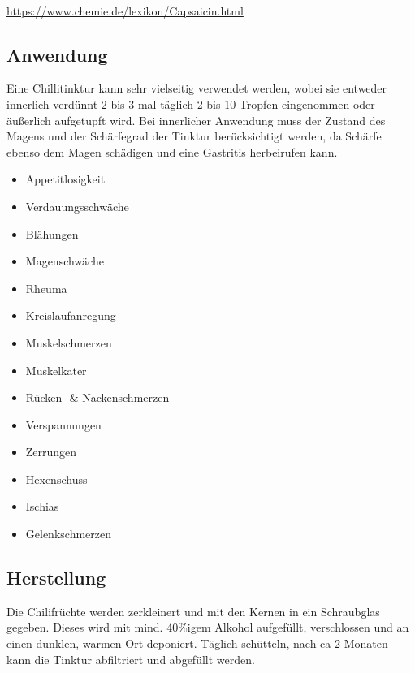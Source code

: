 \cite{tinkturen}  ~\cite{heilkraeuterlexikon}

\url{https://www.chemie.de/lexikon/Capsaicin.html}

                

\subsection{Anwendung}

Eine Chillitinktur kann sehr vielseitig verwendet werden, wobei sie entweder innerlich verdünnt 2 bis 3  mal täglich 2 bis 10 Tropfen eingenommen oder äußerlich aufgetupft wird. Bei innerlicher Anwendung muss der Zustand des Magens und der Schärfegrad der Tinktur berücksichtigt werden, da Schärfe ebenso dem Magen schädigen und eine Gastritis herbeirufen kann. 

\begin{itemize}
	\item Appetitlosigkeit
	\item Verdauungsschwäche
	\item Blähungen
	\item Magenschwäche
	\item Rheuma
	\item Kreislaufanregung
	\item Muskelschmerzen
	\item Muskelkater
	\item Rücken- \& Nackenschmerzen
	\item Verspannungen
	\item Zerrungen
	\item Hexenschuss
	\item Ischias
	\item Gelenkschmerzen 
\end{itemize}

\subsection{Herstellung}

Die Chilifrüchte werden zerkleinert und mit den Kernen in ein Schraubglas gegeben. Dieses wird mit mind. 40\%igem Alkohol aufgefüllt, verschlossen und an einen dunklen, warmen Ort deponiert. Täglich schütteln, nach ca 2 Monaten kann die Tinktur abfiltriert und abgefüllt werden.

